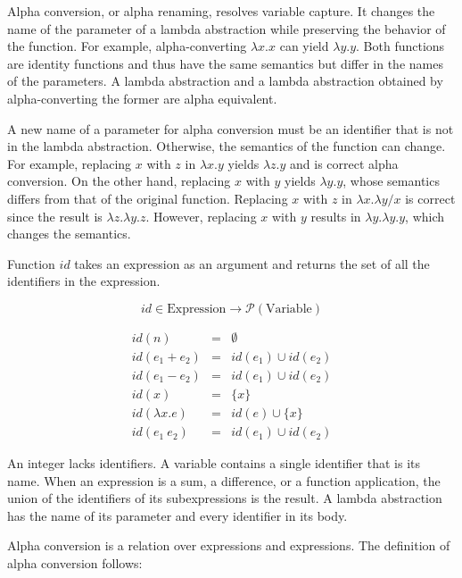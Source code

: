 Alpha conversion, or alpha renaming, resolves variable capture. It changes the
name of the parameter of a lambda abstraction while preserving the behavior of
the function. For example, alpha-converting \(\lambda x.x\) can yield \(\lambda
y.y\). Both functions are identity functions and thus have the same semantics but
differ in the names of the parameters. A lambda abstraction and a lambda
abstraction obtained by alpha-converting the former are alpha equivalent.

A new name of a parameter for alpha conversion must be an identifier that is not
in the lambda abstraction. Otherwise, the semantics of the function can change.
For example, replacing \(x\) with \(z\) in \(\lambda x.y\) yields \(\lambda z.y\)
and is correct alpha conversion. On the other hand, replacing \(x\) with \(y\)
yields \(\lambda y.y\), whose semantics differs from that of the original
function. Replacing \(x\) with \(z\) in \(\lambda x.\lambda y/x\) is correct
since the result is \(\lambda z.\lambda y.z\). However, replacing \(x\) with
\(y\) results in \(\lambda y.\lambda y.y\), which changes the semantics.

Function \(\mathit{id}\) takes an expression as an argument and returns the set
of all the identifiers in the expression.

\[
\mathit{id}\in \text{Expression}\rightarrow \mathcal{P}(\text{Variable})
\]

\[
\begin{array}{rcl}
\mathit{id}(n) & = & \emptyset \\
\mathit{id}(e_1+e_2) & = & \mathit{id}(e_1)\cup\mathit{id}(e_2) \\
\mathit{id}(e_1-e_2) & = & \mathit{id}(e_1)\cup\mathit{id}(e_2) \\
\mathit{id}(x) & = & \{x\} \\
\mathit{id}(\lambda x.e) & = & \mathit{id}(e)\cup\{x\} \\
\mathit{id}(e_1\ e_2) & = & \mathit{id}(e_1)\cup\mathit{id}(e_2)
\end{array}
\]

An integer lacks identifiers. A variable contains a single identifier that is its
name. When an expression is a sum, a difference, or a function application, the
union of the identifiers of its subexpressions is the result. A lambda
abstraction has the name of its parameter and every identifier in its body.

Alpha conversion is a relation over expressions and expressions. The definition
of alpha conversion follows:

